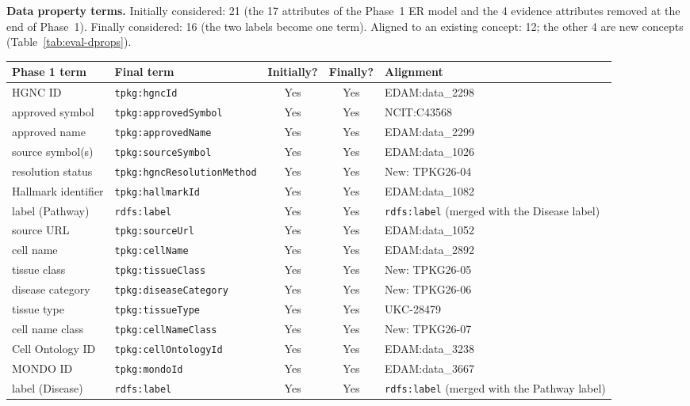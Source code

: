 \noindent\textbf{Data property terms.} Initially considered: 21 (the 17 attributes of the Phase~1 ER model and the 4 evidence attributes removed at the end of Phase~1). Finally considered: 16 (the two labels become one term). Aligned to an existing concept: 12; the other 4 are new concepts (Table~\ref{tab:eval-dprops}).

\begin{table}[htbp]
\centering
\footnotesize
\begin{tabularx}{\linewidth}{|l|l|c|c|X|}
\hline
\textbf{Phase 1 term} & \textbf{Final term} & \textbf{Initially?} & \textbf{Finally?} & \textbf{Alignment} \\ \hline
HGNC ID & \texttt{tpkg:hgncId} & Yes & Yes & EDAM:data\_2298 \\ \hline
approved symbol & \texttt{tpkg:approvedSymbol} & Yes & Yes & NCIT:C43568 \\ \hline
approved name & \texttt{tpkg:approvedName} & Yes & Yes & EDAM:data\_2299 \\ \hline
source symbol(s) & \texttt{tpkg:sourceSymbol} & Yes & Yes & EDAM:data\_1026 \\ \hline
resolution status & \texttt{tpkg:hgncResolutionMethod} & Yes & Yes & New: TPKG26-04 \\ \hline
Hallmark identifier & \texttt{tpkg:hallmarkId} & Yes & Yes & EDAM:data\_1082 \\ \hline
label (Pathway) & \texttt{rdfs:label} & Yes & Yes & \texttt{rdfs:label} (merged with the Disease label) \\ \hline
source URL & \texttt{tpkg:sourceUrl} & Yes & Yes & EDAM:data\_1052 \\ \hline
cell name & \texttt{tpkg:cellName} & Yes & Yes & EDAM:data\_2892 \\ \hline
tissue class & \texttt{tpkg:tissueClass} & Yes & Yes & New: TPKG26-05 \\ \hline
disease category & \texttt{tpkg:diseaseCategory} & Yes & Yes & New: TPKG26-06 \\ \hline
tissue type & \texttt{tpkg:tissueType} & Yes & Yes & UKC-28479 \\ \hline
cell name class & \texttt{tpkg:cellNameClass} & Yes & Yes & New: TPKG26-07 \\ \hline
Cell Ontology ID & \texttt{tpkg:cellOntologyId} & Yes & Yes & EDAM:data\_3238 \\ \hline
MONDO ID & \texttt{tpkg:mondoId} & Yes & Yes & EDAM:data\_3667 \\ \hline
label (Disease) & \texttt{rdfs:label} & Yes & Yes & \texttt{rdfs:label} (merged with the Pathway label) \\ \hline

\end{tabularx}
\end{table}
